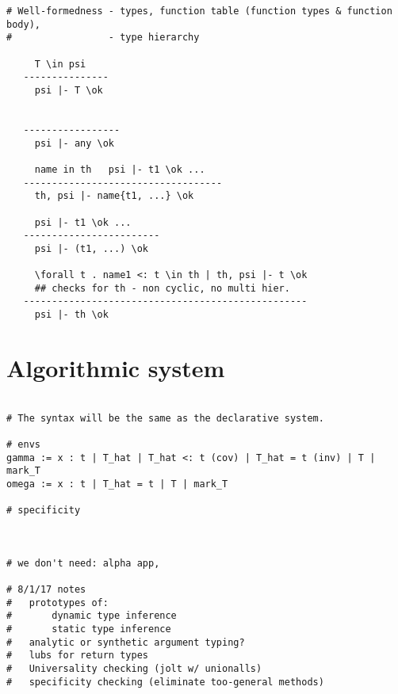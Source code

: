 \documentclass{report} %
\begin{document}
\begin{verbatim}
# Well-formedness - types, function table (function types & function body),
#                 - type hierarchy

     T \in psi
   ---------------
     psi |- T \ok

     
   -----------------
     psi |- any \ok

     name in th   psi |- t1 \ok ...
   -----------------------------------
     th, psi |- name{t1, ...} \ok

     psi |- t1 \ok ...
   ------------------------
     psi |- (t1, ...) \ok 

     \forall t . name1 <: t \in th | th, psi |- t \ok 
     ## checks for th - non cyclic, no multi hier.
   --------------------------------------------------
     psi |- th \ok 

\end{verbatim}

\section*{Algorithmic system}

\begin{verbatim}

# The syntax will be the same as the declarative system.

# envs
gamma := x : t | T_hat | T_hat <: t (cov) | T_hat = t (inv) | T | mark_T 
omega := x : t | T_hat = t | T | mark_T

# specificity



# we don't need: alpha app, 

# 8/1/17 notes
#   prototypes of:
#       dynamic type inference
#       static type inference
#   analytic or synthetic argument typing?
#   lubs for return types
#   Universality checking (jolt w/ unionalls) 
#   specificity checking (eliminate too-general methods)

\end{verbatim}
\end{document}
